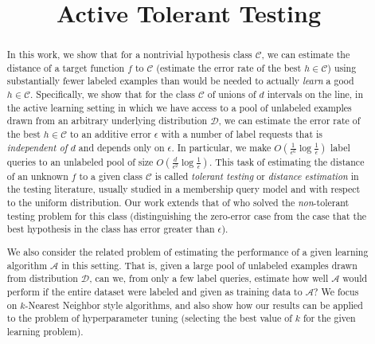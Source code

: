 \documentclass[final,12pt]{colt2018} %
\title{Active Tolerant Testing}
\newcommand{\calC}{{\mathcal{C}}}
\newcommand{\calD}{{\mathcal{D}}}
\newcommand{\calA}{{\mathcal{A}}}
\begin{document}
\maketitle

\begin{abstract}
In this work, we show that for a nontrivial hypothesis class $\calC$, we can estimate the distance of a target function $f$ to $\calC$ (estimate the error rate of the best $h\in \calC$) using substantially fewer labeled examples than would be needed to actually {\em learn} a good $h \in \calC$.   Specifically, we show that for the class $\calC$ of unions of $d$ intervals on the line, in the active learning setting in which we have access to a pool of unlabeled examples drawn from an arbitrary underlying distribution $\calD$, we can estimate the error rate of the best $h \in \calC$ to an additive error $\epsilon$ with a number of label requests that is {\em independent of $d$} and depends only on $\epsilon$.  In particular, we make $O(\frac{1}{\epsilon^6}\log \frac{1}{\epsilon})$ label queries to an unlabeled pool of size $O(\frac{d}{\epsilon^2}\log \frac{1}{\epsilon})$.  This task of estimating the distance of an unknown $f$ to a given class $\calC$  is called {\em tolerant testing} or {\em distance estimation} in the testing literature, usually studied in a membership query model and with respect to the uniform distribution.  Our work extends that of  \citet{BBBY12} who solved the {\em non}-tolerant testing problem for this class (distinguishing the zero-error case from the case that the best hypothesis in the class has error greater than $\epsilon$).  

We also consider the related problem of estimating the performance of a given learning algorithm $\calA$ in this setting.  That is, given a large pool of unlabeled examples drawn from distribution $\calD$, can we, from only a few label queries, estimate how well $\calA$ would perform if the entire dataset were labeled and given as training data to $\calA$?   We focus on $k$-Nearest Neighbor style algorithms, and also show how our results can be applied to the problem of hyperparameter tuning (selecting the best value of $k$ for the given learning problem).
\end{abstract}
\end{document}
